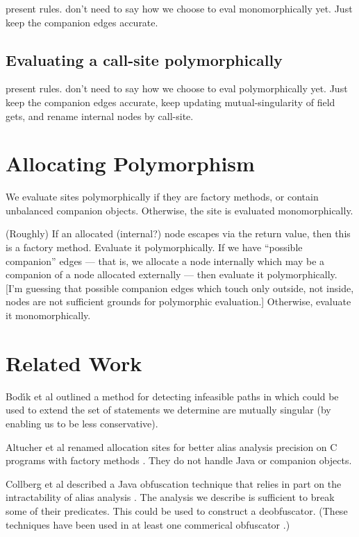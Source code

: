 \documentclass[11pt,notitlepage]{article}
\begin{document}
present rules.  don't need to say how we choose to eval
monomorphically yet.  Just keep the companion edges accurate.

\subsection{Evaluating a call-site polymorphically}

present rules.  don't need to say how we choose to eval
polymorphically yet.  Just keep the companion edges accurate,
keep updating mutual-singularity of field gets,
and rename internal nodes by call-site.

\section{Allocating Polymorphism}

We evaluate sites polymorphically if they are factory methods, or
contain unbalanced companion objects.  Otherwise, the site is
evaluated monomorphically.

(Roughly) If an allocated (internal?) node escapes via the return
value, then this is a factory method.  Evaluate it polymorphically.
If we have ``possible companion'' edges --- that is, we allocate
a node internally which may be a companion of a node allocated
externally --- then evaluate it polymorphically.  [I'm guessing
that possible companion edges which touch only outside, not inside,
nodes are not sufficient grounds for polymorphic evaluation.]
Otherwise, evaluate it monomorphically.

\section{Related Work}

Bod{\'\i}k et al outlined a method for detecting infeasible paths
in \cite{267921} which could be used to extend the set of statements
we determine are mutually singular (by enabling us to be less conservative).

Altucher et al renamed allocation sites for better alias analysis
precision on C programs with factory methods \cite{199466}.  They
do not handle Java or companion objects.

Collberg et al described a Java obfuscation technique that relies in
part on the intractability of alias analysis \cite{268962}.  The
analysis we describe is sufficient to break some of their predicates.
This could be used to construct a deobfuscator.  (These techniques
have been used in at least one commerical obfuscator \cite{humper02}.)



\end{document}
